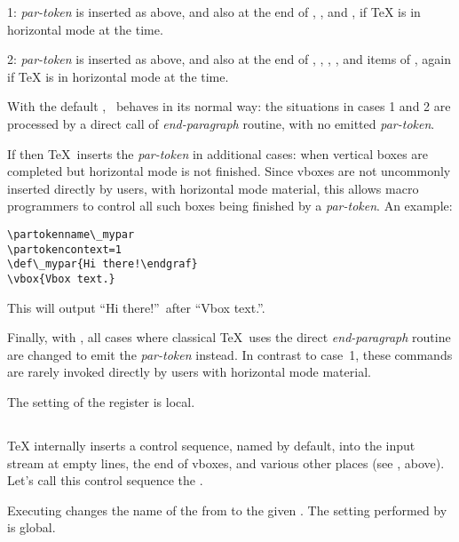 \documentclass{pdftexmanual}
\begin{document}
1: {\em par-token} is inserted as above, and also at the end of
   , , and , if \TeX{} is in
   horizontal mode at the time.

2: {\em par-token} is inserted as above, and also at the end of
  , , , , and
  items of , again if \TeX{} is in horizontal mode at the
  time.

With the default , \TEX\ behaves in its normal
way: the situations in cases 1 and 2 are processed by a direct call of
{\em end-paragraph} routine, with no emitted {\em par-token}.

If  then \TeX\ inserts the {\em par-token} in
additional cases: when vertical boxes are completed but horizontal mode
is not finished. Since vboxes are not uncommonly inserted directly by
users, with horizontal mode material, this allows macro programmers to
control all such boxes being finished by a {\em par-token}. An example:

\begin{verbatim}
\partokenname\_mypar
\partokencontext=1
\def\_mypar{Hi there!\endgraf}
\vbox{Vbox text.}
\end{verbatim}

This will output ``Hi there!''\ after ``Vbox text.''.

Finally, with , all cases where classical \TeX\
uses the direct {\em end-paragraph} routine are changed to emit the {\em
par-token} instead. In contrast to case~1, these commands are rarely
invoked directly by users with horizontal mode material.

The setting of the register  is local.


\subsection{}

\TeX{} internally inserts a control sequence, named  by
default, into the input stream at empty lines, the end of vboxes, and
various other places (see \cs{partokencontext}, above). Let's call this
control sequence the .

Executing  changes the
name of the \varname{par-token} from \cs{par} to the given
\Something{control sequence}. The setting performed by
 is global.
\end{document}
